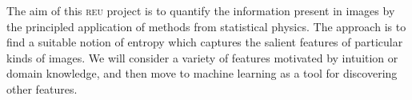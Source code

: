 \documentclass[../notebook.tex]{subfiles}
\begin{document}

The aim of this \textsc{reu} project is to quantify the information present in
images by the principled application of methods from statistical physics. The
approach is to find a suitable notion of entropy which captures the salient
features of particular kinds of images. We will consider a variety of features
motivated by intuition or domain knowledge, and then move to machine learning as
a tool for discovering other features.
\end{document}

